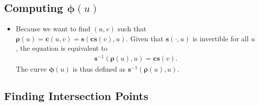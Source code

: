\documentclass[10pt]{article}
\newcommand{\ve}[1]{\bm{#1}}
\begin{document}
\subsection{Computing $\ve{\phi}(u)$}

\begin{itemize}
  \item Because we want to find $(u,v)$ such that $\ve{\rho}(u) = \ve{c}(u,v) = \ve{s}(\ve{cs}(v), u).$ Given that $\ve{s}(\cdot, u)$ is invertible for all $u$, the equation is equivalent to
  \begin{align*}
    \ve{s}^{-1}(\ve{\rho}(u), u) = \ve{cs}(v).
  \end{align*}
  The curve $\ve{\phi}(u)$ is thus defined as $\ve{s}^{-1}(\ve{\rho}(u), u)$.  
\end{itemize}

\subsection{Finding Intersection Points}
\end{document}
